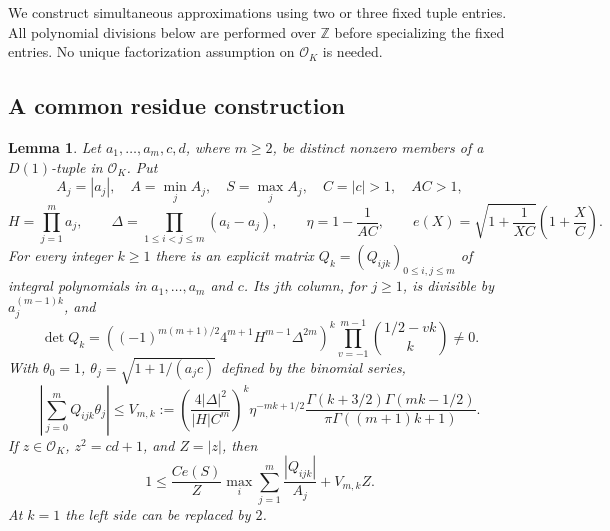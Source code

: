\documentclass[12pt]{article}
\newtheorem{lemma}[theorem]{Lemma}
\numberwithin{equation}{section}
\begin{document}
We construct simultaneous approximations using two or three fixed tuple entries.  All polynomial divisions below are performed over $\mathbb Z$ before specializing the fixed entries. No unique factorization assumption on $\mathcal O_K$ is needed.

\subsection{A common residue construction}

\begin{lemma}\label{lem:ordinary-residue-construction}
Let $a_1,\ldots,a_m,c,d$, where $m\ge2$, be distinct nonzero members of
a $D(1)$-tuple in $\mathcal O_K$.  Put
\[
 A_j=|a_j|,\quad A=\min_j A_j,\quad S=\max_j A_j,
 \quad C=|c|>1,\quad AC>1,
\]
\[
 H=\prod_{j=1}^m a_j,\qquad
 \Delta=\prod_{1\le i<j\le m}(a_i-a_j),\qquad
 \eta=1-\frac1{AC},\qquad
 e(X)=\sqrt{1+\frac1{XC}}\left(1+\frac XC\right).
\]
For every integer $k\ge1$ there is an explicit matrix
$Q_k=(Q_{ijk})_{0\le i,j\le m}$ of integral polynomials in $a_1,\ldots,a_m$ and $c$.  Its $j$th column, for $j\ge1$, is divisible by
$a_j^{(m-1)k}$, and
\begin{equation}\label{eq:ordinary-residue-det}
 \det Q_k=
 \left((-1)^{m(m+1)/2}4^{m+1}H^{m-1}\Delta^{2m}\right)^k
 \prod_{v=-1}^{m-1}\binom{1/2-vk}{k}\ne0.
\end{equation}
With $\theta_0=1$, $\theta_j=\sqrt{1+1/(a_jc)}$ defined by the binomial series,
\begin{equation}\label{eq:ordinary-residue-error}
 \left|\sum_{j=0}^mQ_{ijk}\theta_j\right|
 \le V_{m,k}:=
 \left(\frac{4|\Delta|^2}{|H|C^m}\right)^k
 \eta^{-mk+1/2}
 \frac{\Gamma(k+3/2)\Gamma(mk-1/2)}
 {\pi\Gamma((m+1)k+1)}.
\end{equation}
If $z\in\mathcal O_K$, $z^2=cd+1$, and $Z=|z|$, then
\begin{equation}\label{eq:ordinary-root-transfer}
 1\le\frac{Ce(S)}Z
       \max_i\sum_{j=1}^m\frac{|Q_{ijk}|}{A_j}
       +V_{m,k}Z.
\end{equation}
At $k=1$ the left side can be replaced by $2$.
\end{lemma}
\end{document}

